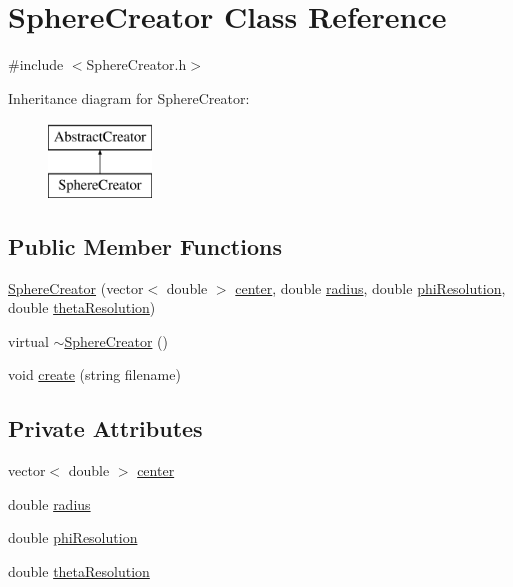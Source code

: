 \hypertarget{class_sphere_creator}{}\section{Sphere\+Creator Class Reference}
\label{class_sphere_creator}


{\ttfamily \#include $<$Sphere\+Creator.\+h$>$}

Inheritance diagram for Sphere\+Creator\+:\begin{figure}[H]
\begin{center}
\leavevmode
\includegraphics[height=2.000000cm]{d5/df1/class_sphere_creator}
\end{center}
\end{figure}
\subsection*{Public Member Functions}
\begin{DoxyCompactItemize}
\item 
\hyperlink{class_sphere_creator_a8fc063b81421021b1da0e77d57071cf6}{Sphere\+Creator} (vector$<$ double $>$ \hyperlink{class_sphere_creator_a4d3548be7ec07037e2d007dc07657de3}{center}, double \hyperlink{class_sphere_creator_aa0e357cf00720699cdaee04253ce492d}{radius}, double \hyperlink{class_sphere_creator_ae324f313bf48348001f328ea3abd9c7c}{phi\+Resolution}, double \hyperlink{class_sphere_creator_a062bf41868fd771016df76cb19550c36}{theta\+Resolution})
\item 
virtual \hyperlink{class_sphere_creator_a6e7073144b46c1988c2974689e5d1d21}{$\sim$\+Sphere\+Creator} ()
\item 
void \hyperlink{class_sphere_creator_a35e16f36b147b2fb2705d9413f5a963e}{create} (string filename)
\end{DoxyCompactItemize}
\subsection*{Private Attributes}
\begin{DoxyCompactItemize}
\item 
vector$<$ double $>$ \hyperlink{class_sphere_creator_a4d3548be7ec07037e2d007dc07657de3}{center}
\item 
double \hyperlink{class_sphere_creator_aa0e357cf00720699cdaee04253ce492d}{radius}
\item 
double \hyperlink{class_sphere_creator_ae324f313bf48348001f328ea3abd9c7c}{phi\+Resolution}
\item 
double \hyperlink{class_sphere_creator_a062bf41868fd771016df76cb19550c36}{theta\+Resolution}
\end{DoxyCompactItemize}


